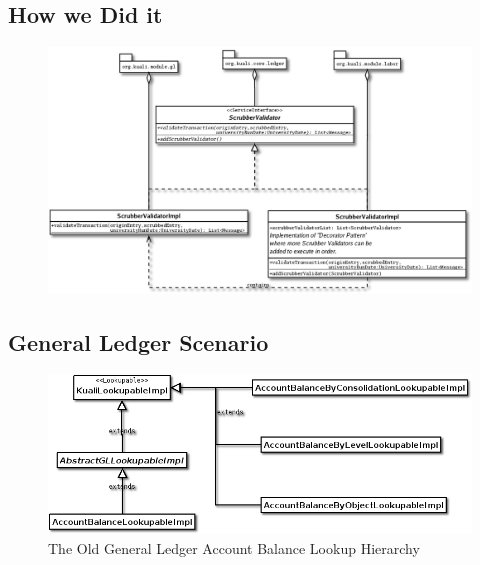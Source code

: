 \documentclass[12pt,notitlepage]{article}
\begin{document}
\begin{s5presentation}
      \W \begin{s5slide}
        \W \section{How we Did it}
        \begin{figure}[!h]
            \W {}
          \T \includegraphics[bb=75 100 550 400]{Diagrams/ScrubberValidator_validateTransactions_class.png}
        \end{figure}
      \W \end{s5slide}


    \W \begin{s5slide}
      \W \section{General Ledger Scenario}
      \begin{figure}[!h]
        \caption{The Old General Ledger Account Balance Lookup Hierarchy}
        \W {}
        \T \includegraphics[bb=100 100 500 300]{Diagrams/GlLookupableImpl_class.png}
      \end{figure}
    \W \end{s5slide}


\end{s5presentation}
\end{document}
